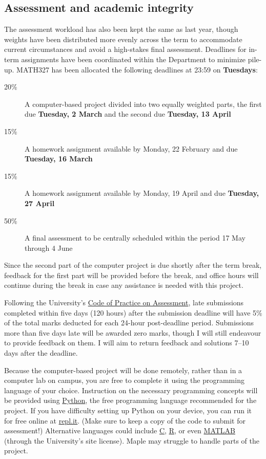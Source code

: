 \subsection*{Assessment and academic integrity}
The assessment workload has also been kept the same as last year, though weights have been distributed more evenly across the term to accommodate current circumstances and avoid a high-stakes final assessment.
Deadlines for in-term assignments have been coordinated within the Department to minimize pile-up.
MATH327 has been allocated the following deadlines at 23:59 on \textbf{Tuesdays}:
\begin{description}
  \item[20\%] A computer-based project divided into two equally weighted parts, the first due \textbf{Tuesday, 2 March} and the second due \textbf{Tuesday, 13 April}
  \item[15\%] A homework assignment available by Monday, 22 February and due \textbf{Tuesday, 16 March}
  \item[15\%] A homework assignment available by Monday, 19 April and due \textbf{Tuesday, 27 April}
  \item[50\%] A final assessment to be centrally scheduled within the period 17 May through 4 June
\end{description}
Since the second part of the computer project is due shortly after the term break, feedback for the first part will be provided before the break, and office hours will continue during the break in case any assistance is needed with this project.

Following the University's \href{https://www.liverpool.ac.uk/media/livacuk/tqsd/aqsd/code_of_practice_on_assessment.pdf}{Code of Practice on Assessment}, late submissions completed within five days (120 hours) after the submission deadline will have 5\% of the total marks deducted for each 24-hour post-deadline period.
Submissions more than five days late will be awarded zero marks, though I will still endeavour to provide feedback on them.
I will aim to return feedback and solutions 7--10 days after the deadline.

Because the computer-based project will be done remotely, rather than in a computer lab on campus, you are free to complete it using the programming language of your choice.
Instruction on the necessary programming concepts will be provided using \href{https://www.python.org}{Python}, the free programming language recommended for the project.
If you have difficulty setting up Python on your device, you can run it for free online at \href{https://repl.it/languages/python3}{repl.it}.
(Make sure to keep a copy of the code to submit for assessment!)
Alternative languages could include \href{https://en.wikipedia.org/wiki/C_(programming_language)}{C}, \href{https://www.r-project.org}{R}, or even \href{https://matlab.mathworks.com}{MATLAB} (through the University's site license).
Maple may struggle to handle parts of the project.

